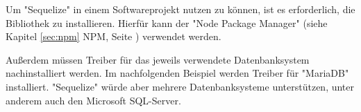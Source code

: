 
Um "Sequelize" in einem Softwareprojekt nutzen zu können, ist es erforderlich, die Bibliothek zu installieren. Hierfür kann der "Node Package Manager" (siehe Kapitel \ref{sec:npm} NPM, Seite \pageref{sec:npm}) verwendet werden. \cite{Sequelize}


Außerdem müssen Treiber für das jeweils verwendete Datenbanksystem nachinstalliert werden. Im nachfolgenden Beispiel werden Treiber für "MariaDB" installiert. "Sequelize" würde aber mehrere Datenbanksysteme unterstützen, unter anderem auch den Microsoft SQL-Server. \cite{SequInstall}

